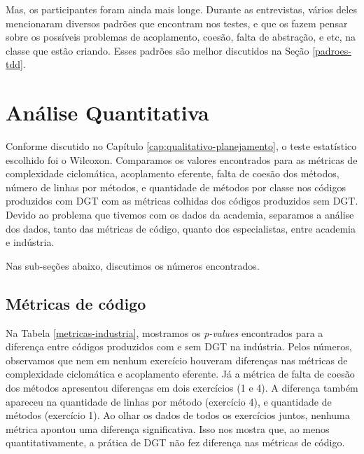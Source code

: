 Mas, os participantes foram ainda mais longe. Durante as entrevistas,
vários deles mencionaram diversos padrões que encontram nos testes,
e que os fazem pensar sobre os possíveis problemas de acoplamento,
coesão, falta de abstração, e etc, na classe que estão criando.
Esses padrões são melhor discutidos na Seção \ref{padroes-tdd}.

\section{Análise Quantitativa}

Conforme discutido no Capítulo \ref{cap:qualitativo-planejamento}, o teste
estatístico escolhido foi o Wilcoxon. Comparamos os valores encontrados
para as métricas de complexidade ciclomática, acoplamento eferente, falta
de coesão dos métodos, número de linhas por métodos, e quantidade de métodos
por classe nos códigos produzidos com DGT com as métricas colhidas dos
códigos produzidos sem DGT.
Devido ao problema que tivemos com os dados da academia, separamos a análise
dos dados, tanto das métricas de código, quanto dos especialistas, entre academia e indústria.

Nas sub-seções abaixo, discutimos os números encontrados.

\subsection{Métricas de código}

Na Tabela \ref{metricas-industria}, mostramos os \textit{p-values} encontrados para
a diferença entre códigos produzidos com e sem DGT na indústria. Pelos números, 
observamos que nem em nenhum exercício houveram diferenças nas métricas
de complexidade ciclomática e acoplamento eferente. Já a métrica de falta
de coesão dos métodos apresentou diferenças em dois exercícios (1 e 4). 
A diferença também apareceu na quantidade de linhas por método (exercício 4),
e quantidade de métodos (exercício 1). Ao olhar os dados de todos os exercícios
juntos, nenhuma métrica apontou uma diferença significativa.
Isso nos mostra que, ao menos quantitativamente, a prática de DGT não fez
diferença nas métricas de código.

